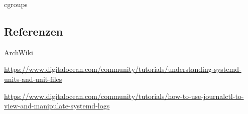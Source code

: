 \begin{frame}
cgroups
\end{frame}

\subsection{Referenzen}

\begin{frame}
\href{https://wiki.archlinux.org/index.php/systemd}{ArchWiki}

\href{https://www.digitalocean.com/community/tutorials/understanding-systemd-units-and-unit-files}{https://www.digitalocean.com/community/tutorials/understanding-systemd-units-and-unit-files}

\href{https://www.digitalocean.com/community/tutorials/how-to-use-journalctl-to-view-and-manipulate-systemd-logs}{https://www.digitalocean.com/community/tutorials/how-to-use-journalctl-to-view-and-manipulate-systemd-logs}
\end{frame}



